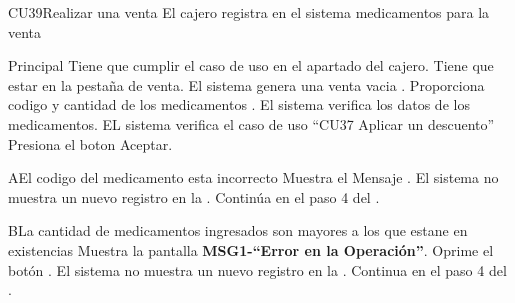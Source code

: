 \begin{UseCase}{CU39}{Realizar una venta}{
		El cajero registra en el sistema medicamentos para la venta
	}
	\end{UseCase}
	\begin{UCtrayectoria}{Principal}
		\UCpaso[\UCactor] Tiene que cumplir el caso de uso  en el apartado del cajero.
		\UCpaso[\UCactor] Tiene que estar en la pestaña de venta.
		\UCpaso El sistema genera una venta vacia . 
		\UCpaso [\UCactor] Proporciona codigo y cantidad de los medicamentos .
		\UCpaso El sistema verifica los datos de los medicamentos.  
		\UCpaso EL sistema verifica el caso de uso ``CU37 Aplicar un descuento''
		\UCpaso Presiona el boton Aceptar.%
		 
	\end{UCtrayectoria}

	\begin{UCtrayectoriaA}{A}{El codigo del medicamento esta incorrecto}
			\UCpaso Muestra el Mensaje .%
			\UCpaso El sistema no muestra un nuevo registro en la .
			\UCpaso Continúa en el paso 4 del .
		\end{UCtrayectoriaA}
		\begin{UCtrayectoriaA}{B}{La cantidad de medicamentos ingresados son mayores a los que estane en existencias}
			\UCpaso Muestra la pantalla {\bf MSG1-``Error en la Operación''}.
			\UCpaso[\UCactor] Oprime el botón .
			\UCpaso El sistema no muestra un nuevo registro en la .
			\UCpaso[] Continua en el paso 4 del .
		\end{UCtrayectoriaA}		
		